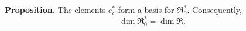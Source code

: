 \textbf{Proposition.} The elements $e_i^*$ form a basis for $\mathfrak{R}_0^*$. Consequently,
$$\dim \mathfrak{R}_0^* = \dim \mathfrak{R}.$$
